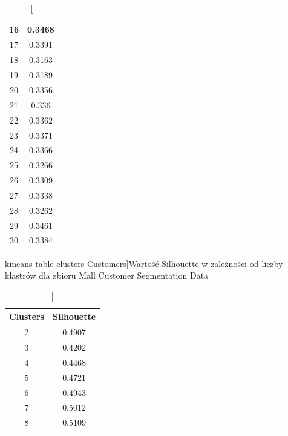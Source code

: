 \documentclass{classrep}
\begin{document}
{{\begin{table}[!htbp]
\begin{minipage}{.24\textwidth}
\begin{tabular}{|c|c|}
                        16 & 0.3468 \\ \hline
                        17 & 0.3391 \\ \hline
                        18 & 0.3163 \\ \hline
                        19 & 0.3189 \\ \hline
                        20 & 0.3356 \\ \hline
                        21 & 0.336 \\ \hline
                        22 & 0.3362 \\ \hline
                        23 & 0.3371 \\ \hline
                        24 & 0.3366 \\ \hline
                        25 & 0.3266 \\ \hline
                        26 & 0.3309 \\ \hline
                        27 & 0.3338 \\ \hline
                        28 & 0.3262 \\ \hline
                        29 & 0.3461 \\ \hline
                        30 & 0.3384 \\ \hline
                    \end{tabular}
                    \caption
                    [kmeans table clusters Customers]{Wartość Silhouette w zależności
                    od liczby klastrów dla zbioru Mall Customer Segmentation Data}
                    \label{kmeans_table_clusters_Customers}
                \end{minipage}
                \hfill
                \begin{minipage}{.24\textwidth}
                    \centering
                    \begin{tabular}{|c|c|}
                        \hline
                        Clusters & Silhouette \\ \hline
                        2 & 0.4907 \\ \hline
                        3 & 0.4202 \\ \hline
                        4 & 0.4468 \\ \hline
                        5 & 0.4721 \\ \hline
                        6 & 0.4943 \\ \hline
                        7 & 0.5012 \\ \hline
                        8 & 0.5109 \\ \hline

\end{tabular}
\end{minipage}
\end{table}}}
\end{document}
